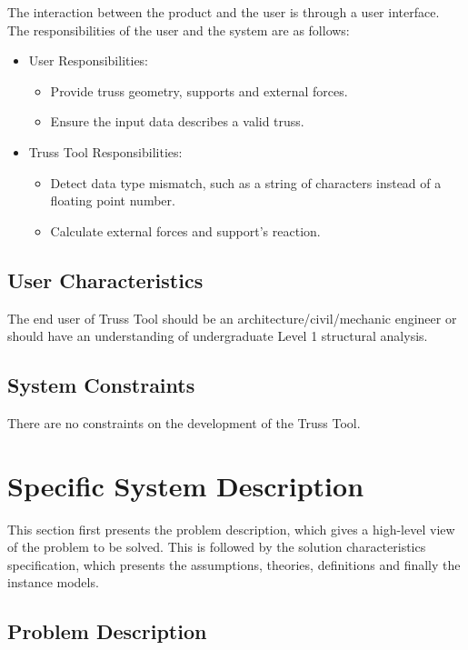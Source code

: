 \documentclass[12pt]{article}
\begin{document}
The interaction between the product and the user is through a user interface. The responsibilities of the user and the system are as follows:
\begin{itemize}
\item User Responsibilities:
\begin{itemize}
\item Provide truss geometry, supports and external forces. 
\item Ensure the input data describes a valid truss.

\end{itemize}
\item Truss Tool Responsibilities:
\begin{itemize}
\item Detect data type mismatch, such as a string of characters instead of a  floating point number.
\item Calculate external forces and support's reaction.
\end{itemize}
\end{itemize}


\subsection{User Characteristics} \label{SecUserCharacteristics}

The end user of Truss Tool should be an architecture/civil/mechanic engineer or should have an understanding of undergraduate Level 1 structural analysis.

\subsection{System Constraints}

There are no constraints on the development of the Truss Tool.


\section{Specific System Description}

This section first presents the problem description, which gives a high-level view of the problem to be solved.  This is followed by the solution characteristics specification, which presents the assumptions, theories, definitions and finally the instance models.


\subsection{Problem Description} \label{Sec_pd}
\end{document}
